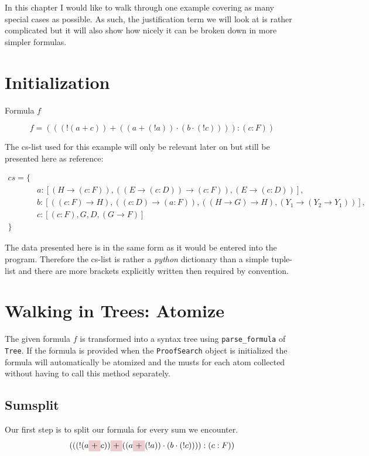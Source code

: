 In this chapter I would like to walk through one example covering as many special cases as possible. As such, the justification term we will look at is rather complicated but it will also show how nicely it can be broken down in more simpler formulas.
\section{Initialization}
Formula $f$

\begin{equation}\label{eq:f}
f = (((!(a+c))+((a+(!a))\cdot (b\cdot (!c)))):(c:F))
\end{equation}


The cs-list used for this example will only be relevant later on but still be presented here as reference:


\begin{equation}\label{cs}
\begin{split}
	cs = \{\\
	& a: [(H \rightarrow (c:F)), ((E \rightarrow (c:D)) \rightarrow (c:F)), (E \rightarrow (c:D))],\\
	& b: [((c:F) \rightarrow H), ((c:D) \rightarrow (a:F)), ((H \rightarrow G) \rightarrow H), (Y_1 \rightarrow (Y_2 \rightarrow Y_1))],\\
	& c: [(c:F), G, D, (G \rightarrow F)] \\
	\}
\end{split}
\end{equation}

The data presented here is in the same form as it would be entered into the program. Therefore the cs-list is rather a \emph{python} dictionary than a simple tuple-list and there are more brackets explicitly written then required by convention.


\section{Walking in Trees: Atomize}

The given formula $f$ is transformed into a syntax tree using \texttt{parse\_formula} of \texttt{Tree}. If the formula is provided when the \texttt{ProofSearch} object is initialized the formula will automatically be atomized and the musts for each atom collected without having to call this method separately. 

\subsection{Sumsplit}
Our first step is to split our formula for every sum we encounter.
\begin{equation*}
	(((!(a
    \tikz[baseline]{\node[fill=red!20,anchor=base] (t1){$+$};} c))
    \tikz[baseline]{\node[fill=red!20,anchor=base] (t2){$+$};} ((a
    \tikz[baseline]{\node[fill=red!20,anchor=base] (t3){$+$};} (!a))\cdot (b\cdot (!c)))):(c:F))
\end{equation*}

